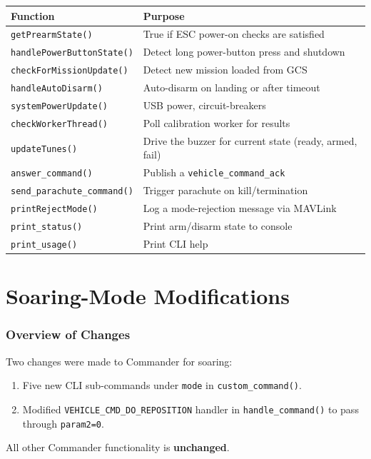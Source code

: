 \documentclass[12pt,a4paper]{article}
\begin{document}
\begin{center}\begin{tabular}{ll}\toprule
Function & Purpose \\\midrule
\texttt{getPrearmState()} & True if ESC power-on checks are satisfied \\
\texttt{handlePowerButtonState()} & Detect long power-button press and shutdown \\
\texttt{checkForMissionUpdate()} & Detect new mission loaded from GCS \\
\texttt{handleAutoDisarm()} & Auto-disarm on landing or after timeout \\
\texttt{systemPowerUpdate()} & USB power, circuit-breakers \\
\texttt{checkWorkerThread()} & Poll calibration worker for results \\
\texttt{updateTunes()} & Drive the buzzer for current state (ready, armed, fail) \\
\texttt{answer\_command()} & Publish a \texttt{vehicle\_command\_ack} \\
\texttt{send\_parachute\_command()} & Trigger parachute on kill/termination \\
\texttt{printRejectMode()} & Log a mode-rejection message via MAVLink \\
\texttt{print\_status()} & Print arm/disarm state to console \\
\texttt{print\_usage()} & Print CLI help \\
\bottomrule\end{tabular}\end{center}

\part{Soaring-Mode Modifications}

\section{Overview of Changes}

Two changes were made to Commander for soaring:
\begin{enumerate}
  \item Five new CLI sub-commands under \texttt{mode} in \texttt{custom\_command()}.
  \item Modified \texttt{VEHICLE\_CMD\_DO\_REPOSITION} handler in
        \texttt{handle\_command()} to pass through \texttt{param2=0}.
\end{enumerate}
All other Commander functionality is \textbf{unchanged}.
\end{document}

